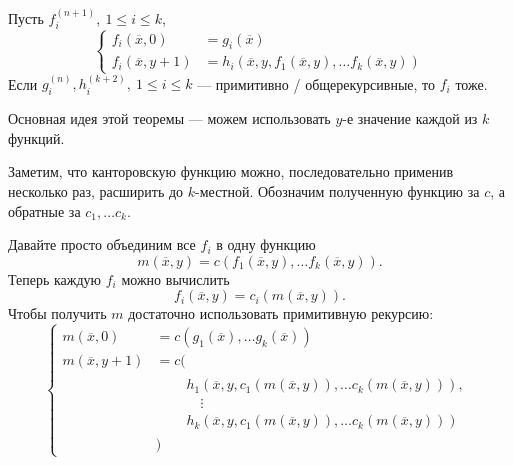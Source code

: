 \begin{thm}
	Пусть $ f_i^{(n+1)}, ~ 1 \le i \le k$,
	\[
	\begin{cases}
		f_i(\overline{x}, 0) &= g_i(\overline{x}) \\
		f_i(\overline{x}, y+1) &= h_i (\overline{x}, y, f_1(\overline{x}, y), \ldots f_{k}(\overline{x}, y))
	\end{cases}
	\] 
	Если $ g_i^{(n)}, h_i^{(k+2)}, ~1 \le i \le k$ --- примитивно / общерекурсивные, то $ f_i$ тоже.
\end{thm}
Основная идея этой теоремы --- можем использовать $ y$-е значение каждой из $ k$ функций.
\begin{proof*}
	Заметим, что канторовскую функцию можно, последовательно применив несколько раз, расширить до $ k$-местной. Обозначим полученную функцию за $ c$, а обратные за $ c_1, \ldots c_{k}$.

	Давайте просто объединим все $ f_i$ в одну функцию 
	\[
		m (\overline{x}, y) = c\left(f_1(\overline{x}, y), \ldots f_k(\overline{x}, y)\right)
	.\]
	Теперь каждую $ f_i$  можно вычислить
	\[
		f_i(\overline{x}, y) = c_i(m (\overline{x}, y))
	.\] 
	Чтобы получить $ m$ достаточно использовать примитивную рекурсию:
	\[
	\begin{cases}
		m(\overline{x}, 0) &= c\left(g_1(\overline{x}), \ldots g_k(\overline{x})\right) \\
		m(\overline{x}, y+1) &= c ( \\
							 &\quad\begin{aligned}
				&h_1\left( \overline{x}, y, c_1(m(\overline{x}, y)), \ldots c_k(m(\overline{x}, y)) \right), \\
				&\quad\vdots \\
				&h_k\left( \overline{x}, y, c_1(m(\overline{x}, y)), \ldots c_k(m(\overline{x}, y)) \right)
			\end{aligned} \\
							 &) 
	\end{cases}
	\] 
\end{proof*}


